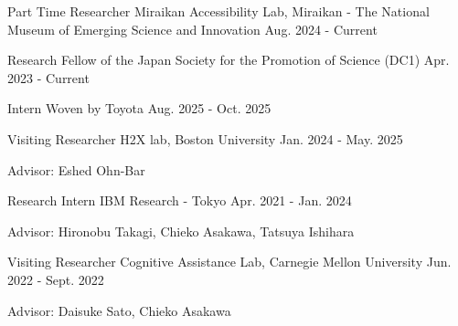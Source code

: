 
\begin{cventries}

  \cventry
    {Part Time Researcher}
    {Miraikan Accessibility Lab, Miraikan - The National Museum of Emerging Science and Innovation}
    {}
    {Aug. 2024 - Current}
    {}

  \cventry
    {Research Fellow of the Japan Society for the Promotion of Science (DC1)}
    {}
    {}
    {Apr. 2023 - Current}
    {}

  \cventry
    {Intern}
    {Woven by Toyota}
    {}
    {Aug. 2025 - Oct. 2025}
    {}

  \cventry
    {Visiting Researcher}
    {H2X lab, Boston University}
    {}
    {Jan. 2024 - May. 2025}
    {
      \begin{cvitems}
        \item {Advisor: Eshed Ohn-Bar}
      \end{cvitems}
    }

  \cventry
    {Research Intern}
    {IBM Research - Tokyo}
    {}
    {Apr. 2021 - Jan. 2024}
    {
      \begin{cvitems}
        \item {Advisor: Hironobu Takagi, Chieko Asakawa, Tatsuya Ishihara}
      \end{cvitems}
    }

  \cventry
    {Visiting Researcher}
    {Cognitive Assistance Lab, Carnegie Mellon University}
    {}
    {Jun. 2022 - Sept. 2022}
    {
      \begin{cvitems}
        \item {Advisor: Daisuke Sato, Chieko Asakawa}
      \end{cvitems}
    }

\end{cventries}
